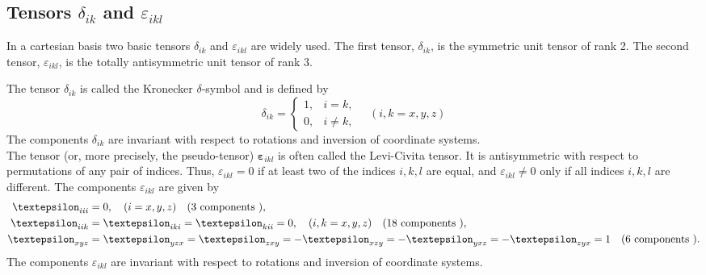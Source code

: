 \subsection{Tensors \(\delta_{i k}\) and \(\varepsilon_{i k l}\)}\label{sec:1.2.5}
In a cartesian basis two basic tensors \(\delta_{i k}\) and \(\varepsilon_{i k l}\) are widely used. The first tensor, \(\delta_{i k}\), is the symmetric unit tensor of rank 2. The second tensor, \(\varepsilon_{i k l}\), is the totally antisymmetric unit tensor of rank 3.

The tensor \(\delta_{i k}\) is called the Kronecker \(\delta\)-symbol and is defined by
\begin{equation}
\delta_{i k}=\left\{\begin{array}{ll}
1, & i=k,  \label{eq:1:2:34}\\
0, & i \neq k,
\end{array} \quad(i, k=x, y, z)\right.
\end{equation}
The components \(\delta_{i k}\) are invariant with respect to rotations and inversion of coordinate systems.\\
The tensor (or, more precisely, the pseudo-tensor) \(\boldsymbol{\varepsilon}_{i k l}\) is often called the Levi-Civita tensor. It is antisymmetric with respect to permutations of any pair of indices. Thus, \(\varepsilon_{i k l}=0\) if at least two of the indices \(i, k, l\) are equal, and \(\varepsilon_{i k l} \neq 0\) only if all indices \(i, k, l\) are different. The components \(\varepsilon_{i k l}\) are given by
\begin{align}
\varepsilon_{i i i} & =0, \quad(i=x, y, z) \quad(3 \text { components }),  \notag\\
\varepsilon_{i i k} & =\varepsilon_{i k i}=\varepsilon_{k i i}=0, \quad(i, k=x, y, z) \quad(18 \text { components }),  \label{eq:1:2:35}\\
\varepsilon_{x y z} & =\varepsilon_{y z x}=\varepsilon_{z x y}=-\varepsilon_{x z y}=-\varepsilon_{y x z}=-\varepsilon_{z y x}=1 \quad(6 \text { components }) . \notag
\end{align}
The components \(\varepsilon_{i k l}\) are invariant with respect to rotations and inversion of coordinate systems.

